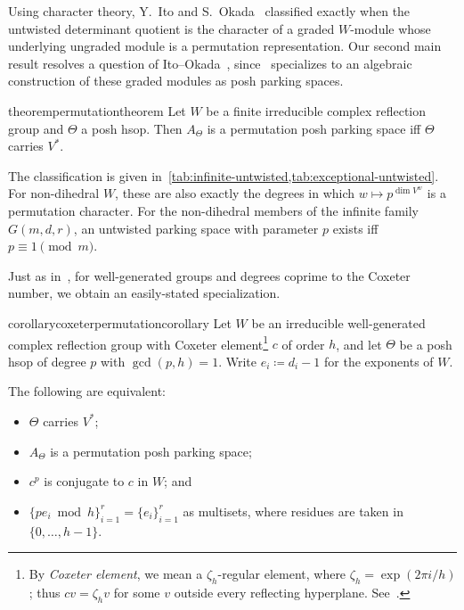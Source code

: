 \documentclass[10pt,a4paper]{amsart}
\newcommand{\defeq}{\coloneqq}
\theoremstyle{definition}
\begin{document}
Using character theory, Y.~Ito and S.~Okada~\cite[Theorem~1.4]{IO} classified exactly when the untwisted determinant quotient is the character of a graded $W$-module whose underlying ungraded module is a permutation representation.  %
Our second main result resolves a question of Ito--Okada~\cite[Problem 7.3(2)]{IO}, since~ specializes to an algebraic construction of these graded modules as posh parking spaces. %

\begin{restatable}{theorem}{permutationtheorem}\label{c:thm:untwisted}
Let $W$ be a finite irreducible complex reflection group and $\Theta$ a posh hsop. Then $A_\Theta$ is a permutation posh parking space iff $\Theta$ carries $V^*$.
\end{restatable}

The classification is given in~\cref{tab:infinite-untwisted,tab:exceptional-untwisted}.
For non-dihedral $W$, these are also exactly the degrees in which $w\mapsto p^{\dim V^w}$ is a permutation character.  For the non-dihedral members of the infinite family $G(m,d,r)$, an untwisted parking space with parameter $p$ exists iff $p\equiv1\pmod m$.

Just as in~, for well-generated groups and degrees coprime to the Coxeter number,
we obtain an easily-stated specialization.

\begin{restatable}{corollary}{coxeterpermutationcorollary}\label{cor:coxeter-permutation}
Let $W$ be an irreducible well-generated complex reflection group with
Coxeter element\footnote{By \emph{Coxeter element}, we mean a
$\zeta_h$-regular element, where $\zeta_h=\exp(2\pi i/h)$;
thus $cv=\zeta_hv$ for some $v$ outside every reflecting hyperplane.
See~\cite[Section~1.1]{RRS}.} $c$ of order $h$, and let $\Theta$ be a posh hsop of degree $p$
with $\gcd(p,h)=1$. Write $e_i\defeq d_i-1$ for the exponents of $W$.

The following are equivalent:
\begin{itemize}
\item $\Theta$ carries $V^*$;
\item $A_\Theta$ is a permutation posh parking space;
\item $c^p$ is conjugate to $c$ in $W$; and
\item $
 \{p e_i\bmod h\}_{i=1}^r=\{e_i\}_{i=1}^r$
as multisets, where residues are taken in $\{0,\ldots,h-1\}$.
\end{itemize}
\end{restatable}
\end{document}
